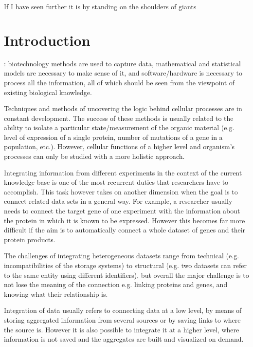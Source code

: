 \begin{savequote}[75mm] 
If I have seen further it is by standing on the shoulders of giants
\end{savequote}

\chapter{Introduction}

: biotechnology methods are used to capture data, mathematical and statistical models are necessary to make sense of it, and software/hardware is necessary to process all the information,  all of which should be seen from the viewpoint of existing biological knowledge.

Techniques and methods of uncovering the logic behind cellular processes are in constant development. The success of these methods is usually related to the ability to isolate a particular state/measurement of the organic material (e.g. level of expression of a single protein, number of mutations of a gene in a population, etc.). However,  cellular functions of a higher level and organism's processes can only be studied with a more holistic approach.

Integrating information from different experiments in the context of the current knowledge-base is one of the most recurrent duties that researchers have to accomplish. This task however takes on another dimension when the goal is to connect related data sets in a general way. For example, a researcher usually needs to connect the target gene of one experiment with the information about the protein in which it is known to be expressed.  However this becomes far more difficult if the aim is to automatically connect a whole dataset of genes and their protein products.

The challenges of integrating heterogeneous datasets range from technical (e.g. incompatibilities of the storage systems) to structural (e.g. two datasets can refer to the same entity using different identifiers), but overall the major challenge is to not lose the meaning of the connection e.g. linking proteins and genes, and knowing what their relationship is.

Integration of data usually refers to connecting data at a low level, by means of storing aggregated information from several sources or by saving links to where the source is. However it is also possible to integrate it at a higher level, where information is not saved and the aggregates are built and visualized on demand.

